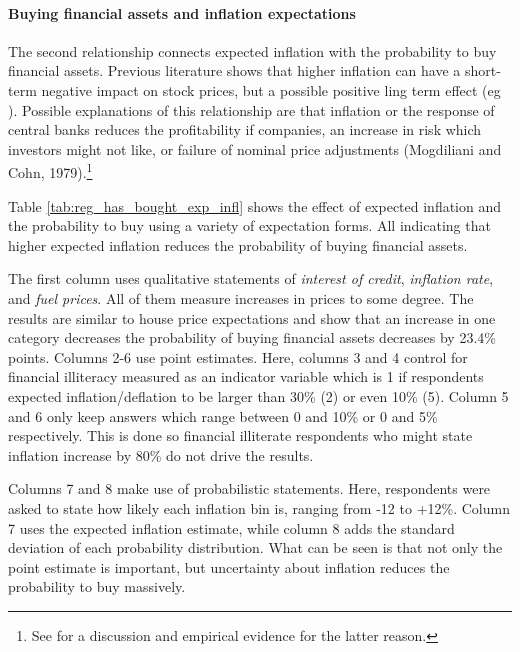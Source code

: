 \documentclass[ProjectABM]{subfiles}
\begin{document}
\paragraph{Buying financial assets and inflation expectations}
The second relationship connects expected inflation with the probability to buy financial assets. Previous literature shows that higher inflation can have a short-term negative impact on stock prices, but a possible positive ling term effect (eg \cite{anari_kolari_2001inflation}). Possible explanations of this relationship are that inflation or the response of central banks reduces the profitability if companies, an increase in risk which investors might not like, or failure of nominal price adjustments (Mogdiliani and Cohn, 1979).\footnote{See \cite{campbell_vuolteenaho_2004inflation} for a discussion and empirical evidence for the latter reason.}

Table \ref{tab:reg_has_bought_exp_infl} shows the effect of expected inflation and the probability to buy using a variety of expectation forms. All indicating that higher expected inflation reduces the probability of buying financial assets.

The first column uses qualitative statements of \textit{interest of credit}, \textit{inflation rate}, and \textit{fuel prices}. All of them measure increases in prices to some degree. The results are similar to house price expectations and show that an increase in one category decreases the probability of buying financial assets decreases by 23.4\% points. Columns 2-6 use point estimates. Here, columns 3 and 4 control for financial illiteracy measured as an indicator variable which is 1 if respondents expected inflation/deflation to be larger than 30\% (2) or even 10\% (5). Column 5 and 6 only keep answers which range between 0 and 10\% or 0 and 5\% respectively. This is done so financial illiterate respondents who might state inflation increase by 80\% do not drive the results.

Columns 7 and 8 make use of probabilistic statements. Here, respondents were asked to state how likely each inflation bin is, ranging from -12 to +12\%. Column 7 uses the expected inflation estimate, while column 8 adds the standard deviation of each probability distribution. What can be seen is that not only the point estimate is important, but uncertainty about inflation reduces the probability to buy massively.
\end{document}
